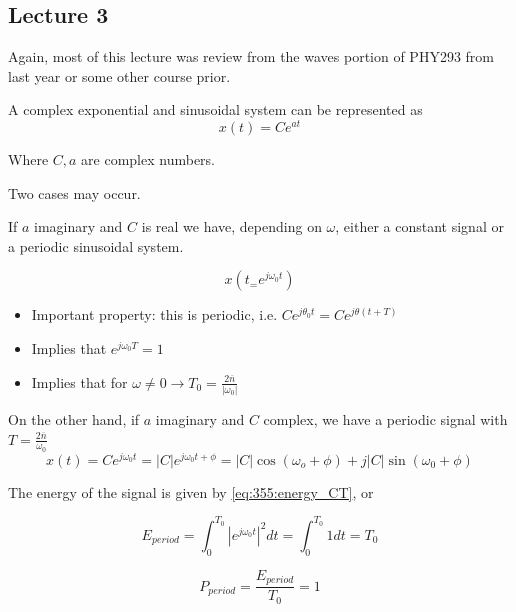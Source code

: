 \documentclass[10pt]{article}
\begin{document}
\subsection{Lecture 3}

Again, most of this lecture was review from the waves portion of PHY293 from last year or some other course prior.



A complex exponential and sinusoidal system can be represented as 
\begin{equation}
	x(t) = C e^{at}
\end{equation}

Where $ C, a $ are complex numbers.

Two cases may occur.

If $ a $ imaginary and $ C $ is real we have, depending on $ \omega $, either a constant signal or a periodic sinusoidal system.

\begin{equation}
	x(t_ = e^{j\omega_0t}) 
\end{equation}

\begin{itemize}
	\item Important property: this is periodic, i.e. $ Ce^{j\theta_0 t} = Ce^{j \theta (t + T)} $ 
	\item Implies that $ e^{j\omega_0T} = 1 $ 
	\item Implies that for $ \omega \neq  0 \rightarrow T_0 = \frac{2 \overline{n}}{|\omega_0|} $ 	
\end{itemize}


On the other hand, if $ a $ imaginary and  $ C $ complex, we have a periodic signal with $ T = \frac{2 \overline{n}}{\omega_0} $ 
\begin{equation}
	x(t) = Ce^{j\omega_0 t} = |C|e^{j\omega_0t + \phi} =  |C| \cos(\omega_o + \phi) + j|C| \sin(\omega_0 + \phi)
\end{equation}


The energy of the signal is given by \eqref{eq:355:energy_CT}, or



\begin{equation}
	E_{period} = \int^{T_0}_0 |e^{j\omega_0 t}|^2 dt = \int^{T_0}_0 1 dt = T_0
\end{equation}


\begin{equation}
	P_{period} = \frac{E_{period}}{T_0} = 1
\end{equation}
\end{document}
